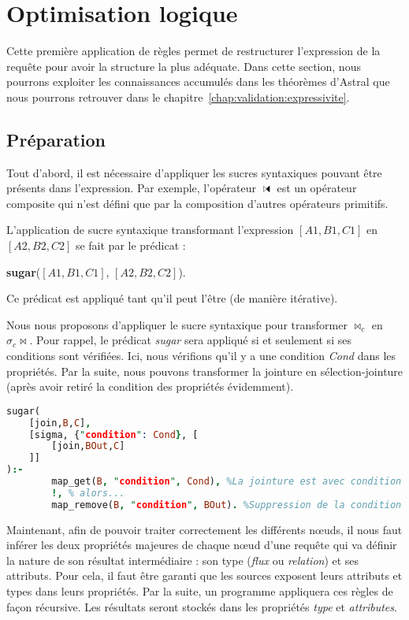 \section{Optimisation logique}\label{sec:contrib:astronef:logique}
Cette première application de règles permet de restructurer l'expression de la requête pour avoir la structure la plus adéquate. Dans cette section, nous pourrons exploiter les connaissances accumulés dans les théorèmes d'Astral que nous pourrons retrouver dans le chapitre~\ref{chap:validation:expressivite}.
\subsection{Préparation}
Tout d'abord, il est nécessaire d'appliquer les sucres syntaxiques pouvant être présents dans l'expression. Par exemple, l'opérateur $\ssjoin$ est un opérateur composite qui n'est défini que par la composition d'autres opérateurs primitifs.

\begin{regle}
L'application de sucre syntaxique transformant l'expression $[A1,B1,C1]$ en $[A2,B2,C2]$ se fait par le prédicat :
\begin{center} \textbf{sugar}($[A1,B1,C1]$, $[A2,B2,C2]$).\end{center}
Ce prédicat est appliqué tant qu'il peut l'être (de manière itérative).
\end{regle}

\begin{example}
	Nous nous proposons d'appliquer le sucre syntaxique pour transformer $\Join_c$ en $\sigma_c \Join$. Pour rappel, le prédicat \textit{sugar} sera appliqué si et seulement si ses conditions sont vérifiées. Ici, nous vérifions qu'il y a une condition \textit{Cond} dans les propriétés. Par la suite, nous pouvons transformer la jointure en sélection-jointure (après avoir retiré la condition des propriétés évidemment).
	\begin{lstlisting}[language=Prolog]
sugar(
	[join,B,C], 
	[sigma, {"condition": Cond}, [
		[join,BOut,C]
	]]
):-
    	map_get(B, "condition", Cond), %La jointure est avec condition
    	!, % alors...
    	map_remove(B, "condition", BOut). %Suppression de la condition
	\end{lstlisting}
\end{example}

Maintenant, afin de pouvoir traiter correctement les différents nœuds, il nous faut inférer les deux propriétés majeures de chaque nœud d'une requête qui va définir la nature de son résultat intermédiaire : son type (\textit{flux} ou \textit{relation}) et ses attributs. Pour cela, il faut être garanti que les sources exposent leurs attributs et types dans leurs propriétés. Par la suite, un programme appliquera ces règles de façon récursive. Les résultats seront stockés dans les propriétés \textit{type} et \textit{attributes}.

